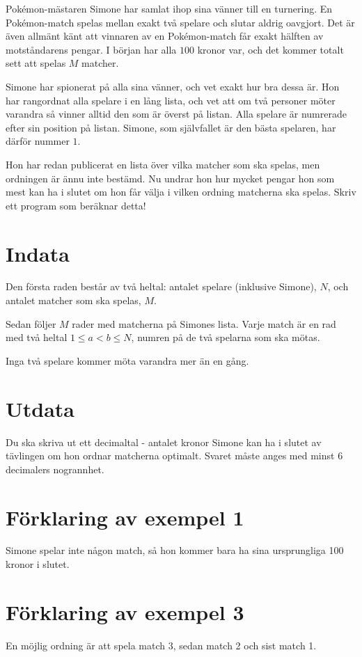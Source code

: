 Pokémon-mästaren Simone har samlat ihop sina vänner till en turnering. En
Pokémon-match spelas mellan exakt två spelare och slutar aldrig oavgjort. Det
är även allmänt känt att vinnaren av en Pokémon-match får exakt hälften av
motståndarens pengar. I början har alla $100$ kronor var, och det kommer totalt
sett att spelas $M$ matcher.

Simone har spionerat på alla sina vänner, och vet exakt hur bra dessa är. Hon
har rangordnat alla spelare i en lång lista, och vet att om två personer möter
varandra så vinner alltid den som är överst på listan. Alla spelare är numrerade efter
sin position på listan. Simone, som självfallet är den bästa spelaren, har
därför nummer $1$.

Hon har redan publicerat en lista över vilka matcher som ska spelas, men
ordningen är ännu inte bestämd. Nu undrar hon hur
mycket pengar hon som mest kan ha i slutet om hon får välja i vilken ordning
matcherna ska spelas. Skriv ett program som beräknar detta!

\section*{Indata}
Den första raden består av två heltal: antalet spelare (inklusive Simone), $N$,
och antalet matcher som ska spelas, $M$.

Sedan följer $M$ rader med matcherna på Simones lista. Varje match är en rad
med två heltal $1 \le a < b \le N$, numren på de två spelarna som ska mötas.

Inga två spelare kommer möta varandra mer än en gång.

\section*{Utdata}
Du ska skriva ut ett decimaltal - antalet kronor Simone kan ha i slutet av
tävlingen om hon ordnar matcherna optimalt. Svaret måste anges med minst $6$ decimalers nogrannhet.

\section*{Förklaring av exempel 1}
Simone spelar inte någon match, så hon kommer bara ha sina ursprungliga 100
kronor i slutet.

\section*{Förklaring av exempel 3}
En möjlig ordning är att spela match 3, sedan match 2 och sist match 1.

